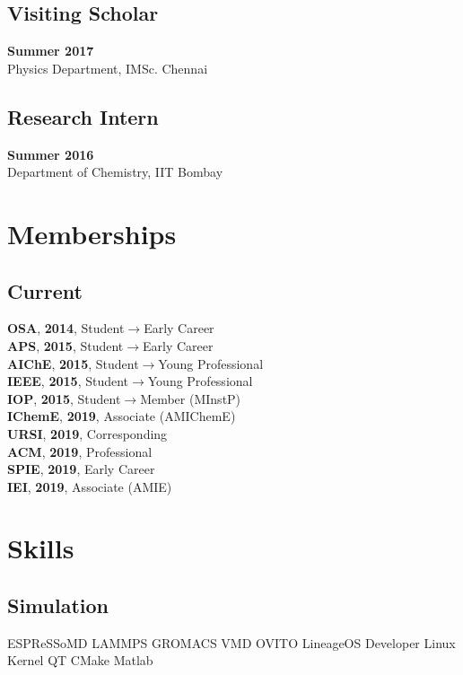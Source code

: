 \documentclass[letterpaper]{deedy-resume} %
\begin{document}
\begin{minipage}[t]{0.36\textwidth}
	\subsection{Visiting Scholar}
	\textbf{Summer 2017}\\ Physics Department, IMSc. Chennai
	\subsection{Research Intern}
	\textbf{Summer 2016}\\ Department of Chemistry, IIT Bombay


	\vspace{-5pt}
	\section{Memberships}
	\subsection{Current}
	\textbf{OSA}, \textbf{2014}, Student$\to$Early Career\\
	\textbf{APS}, \textbf{2015}, Student$\to$Early Career\\
	\textbf{AIChE}, \textbf{2015}, Student$\to$Young Professional\\
	\textbf{IEEE}, \textbf{2015}, Student$\to$Young Professional\\
	\textbf{IOP}, \textbf{2015}, Student$\to$Member (MInstP)\\
	\textbf{IChemE}, \textbf{2019}, Associate (AMIChemE)\\
	\textbf{URSI}, \textbf{2019}, Corresponding \\
	\textbf{ACM}, \textbf{2019}, Professional \\
	\textbf{SPIE}, \textbf{2019}, Early Career \\
	\textbf{IEI}, \textbf{2019}, Associate (AMIE)
	\vspace{-5pt}



	\section{Skills}
	\subsection{Simulation}
	ESPReSSoMD \textbullet{} LAMMPS \textbullet{} GROMACS \textbullet{} VMD \textbullet{} OVITO\textbullet{} LineageOS Developer\textbullet{} Linux Kernel\textbullet{} QT\textbullet{} CMake\textbullet{} Matlab\\

\end{minipage}
\end{document}
